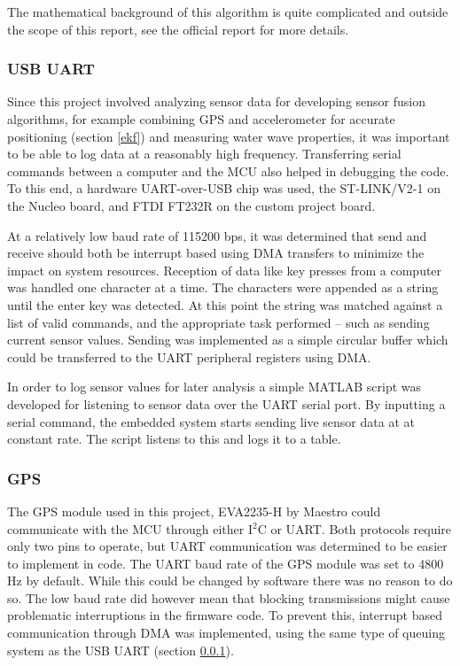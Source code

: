 The mathematical background of this algorithm is quite complicated and outside the scope of this report, see the official report \cite{madgwick-report} for more details.


\subsubsection{USB UART}
\label{usb-uart}
Since this project involved analyzing sensor data for developing sensor fusion algorithms, for example combining GPS and accelerometer for accurate positioning (section \ref{ekf}) and measuring water wave properties, it was important to be able to log data at a reasonably high frequency. Transferring serial commands between a computer and the MCU also helped in debugging the code. To this end, a hardware UART-over-USB chip was used, the ST-LINK/V2-1 on the Nucleo board, and FTDI FT232R on the custom project board.

At a relatively low baud rate of 115200 bps, it was determined that send and receive should both be interrupt based using DMA transfers to minimize the impact on system resources. Reception of data like key presses from a computer was handled one character at a time. The characters were appended as a string until the enter key was detected. At this point the string was matched against a list of valid commands, and the appropriate task performed -- such as sending current sensor values. Sending was implemented as a simple circular buffer which could be transferred to the UART peripheral registers using DMA.

In order to log sensor values for later analysis a simple MATLAB script was developed for listening to sensor data over the UART serial port. By inputting a serial command, the embedded system starts sending live sensor data at at constant rate. The script listens to this and logs it to a table.


\subsubsection{GPS}
The GPS module used in this project, EVA2235-H by Maestro \cite{gps} could communicate with the MCU through either I$^2$C or UART. Both protocols require only two pins to operate, but UART communication was determined to be easier to implement in code. The UART baud rate of the GPS module was set to 4800 Hz by default. While this could be changed by software there was no reason to do so. The low baud rate did however mean that blocking transmissions might cause problematic interruptions in the firmware code. To prevent this, interrupt based communication through DMA was implemented, using the same type of queuing system as the USB UART (section \ref{usb-uart}).

